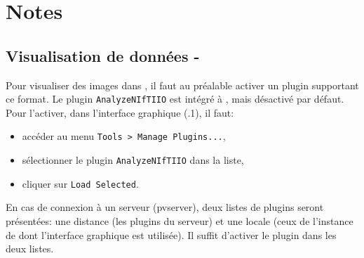 \renewcommand{\chpath}{00-notes/}
\renewcommand{\imgpath}{\chpath img/}
\renewcommand{\secpath}{\chpath}
\chapter{Notes}
\label{chap:notes}

\section{Visualisation de données - \paraview}
Pour visualiser des images \nii dans \paraview, il faut au préalable activer un plugin supportant ce format. 
Le plugin \texttt{AnalyzeNIfTIIO} est intégré à \paraview, mais désactivé par défaut. Pour l'activer, dans l'interface graphique (.1), il faut:

\begin{itemize}
\item accéder au menu \texttt{Tools > Manage Plugins...},
\item sélectionner le plugin \texttt{AnalyzeNIfTIIO} dans la liste,
\item cliquer sur \texttt{Load Selected}.
\end{itemize}

En cas de connexion à un serveur \paraview (pvserver), deux listes de plugins seront présentées: une distance (les plugins du serveur) et une locale (ceux de l'instance de \paraview dont l'interface graphique est utilisée). Il suffit d'activer le plugin dans les deux listes.

%